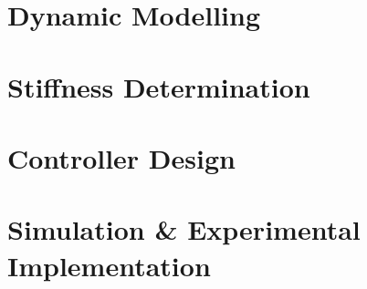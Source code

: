 \documentclass[11pt,twoside]{report}
\begin{document}
\newpage
\begin{spacing}{1}

\end{spacing}

\cleardoublepage

\begin{appendices}

\chapter{Dynamic Modelling}

\cleardoublepage

\chapter{Stiffness Determination}

\cleardoublepage

\chapter{Controller Design}

\cleardoublepage

\chapter{Simulation \& Experimental Implementation}

\cleardoublepage
\end{appendices}
\end{document}
